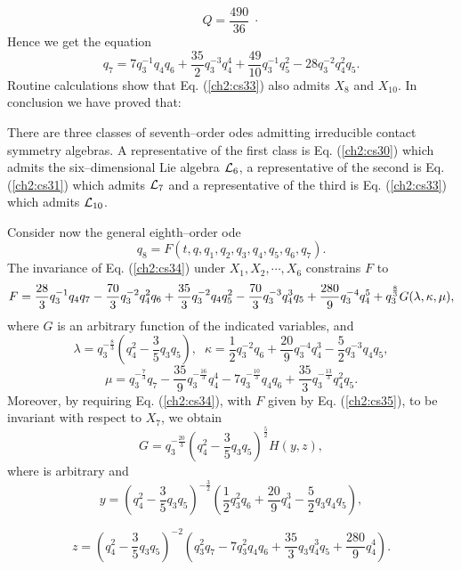 \[Q=\frac{490}{36}\;\cdot\]
Hence we get the equation
\begin{equation}
q_7=7q_3^{-1}q_4q_6+\frac{35}{2}q_3^{-3}q_4^4+\frac{49}{10}q_3^{-1}
q_5^2-28q_3^{-2}q_4^2q_5.
\label{ch2:cs33}
\end{equation}
Routine calculations show that Eq. (\ref{ch2:cs33})
also admits $X_8$ and $X_{10}$. In conclusion we have proved that:
\begin{theo}
\label{ch2:7cont}
\begin{em}
There are  three classes of seventh--order odes admitting
irreducible contact
symmetry algebras. A representative of the first class is Eq. (\ref{ch2:cs30})
which
admits the six--dimensional Lie algebra ${\cal L}_6$, a representative of the
second is Eq. (\ref{ch2:cs31}) which admits ${\cal L}_7$ and a representative of the
third is Eq. (\ref{ch2:cs33}) which admits ${\cal L}_{10}$.
\end{em}
\end{theo}
Consider now the general eighth--order ode
\begin{equation}
q_8=F(t,q,q_1,q_2,q_3,q_4,q_5,q_6,q_7).
\label{ch2:cs34}
\end{equation}
The invariance of Eq. (\ref{ch2:cs34})  under $X_1,X_2,\cdots, X_6$
constrains $F$ to
\begin{equation}
F=\frac{28}{3}q_3^{-1}q_4q_7-\frac{70}{3}q_3^{-2}q_4^2q_6
+\frac{35}{3}q_3^{-2}q_4q_5^2-\frac{70}{3}q_3^{-3}q_4^3q_5\nonumber\\
+\frac{280}{9}q_3^{-4}q_4^5+q_3^{\frac{8}{3}}G(\lambda,\kappa,\mu),
\label{ch2:cs35}
\end{equation}
where $G$ is an arbitrary function of the indicated variables, and
\[ \lambda=q_3^{-\frac{8}{3}}(q_4^2-\frac{3}{5}q_3q_5),\;\;
\kappa=\frac{1}{2}q_3^{-2}q_6+\frac{20}{9}q_3^{-4}q_4^3-
\frac{5}{2}q_3^{-3}q_4q_5,\]
\[ \mu=q_3^{-\frac{7}{3}}q_7-\frac{35}{9}q_3^{-\frac{16}{3}}q_4^4
-7q_3^{-\frac{10}{3}}q_4q_6+\frac{35}{3}q_3^{-\frac{13}{3}}q_4^2q_5.\]
Moreover, by requiring Eq. (\ref{ch2:cs34}), with  $F$ given by
Eq. (\ref{ch2:cs35}), to be invariant with respect to $X_7$, we obtain
\begin{equation}
G=q_3^{-\frac{20}{3}}(q_4^2-\frac{3}{5}q_3q_5)^{\frac{5}{2}}H(y,z),
\label{ch2:cs36}
\end{equation}
where is arbitrary and
\[ y=(q_4^2-\frac{3}{5}q_3q_5)^{-\frac{3}{2}}(\frac{1}{2}q_3^2q_6
+\frac{20}{9}q_4^3-\frac{5}{2}q_3q_4q_5),\]

\[z=(q_4^2-\frac{3}{5}q_3q_5)^{-2}(q_3^2q_7-7q_3^2q_4q_6
+\frac{35}{3}q_3q_4^3q_5+\frac{280}{9}q_4^4).\]

